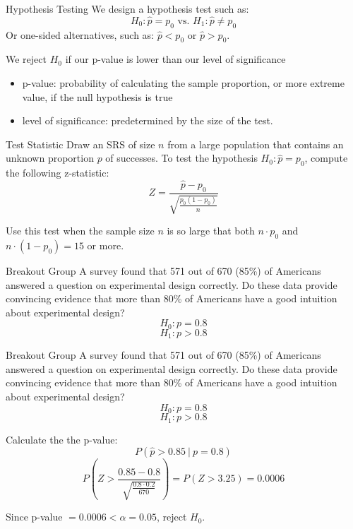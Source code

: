 \documentclass{beamer}
\begin{document}
\begin{frame}{Hypothesis Testing}
	We design a hypothesis test such as:
	\[ 
		H_0: \hat{p}=p_0 \text{ vs. } H_1: \hat{p} \neq p_0 
	\]
	Or one-sided alternatives, such as: $\hat{p} < p_0$ or $\hat{p} > p_0$.
	
	We reject $H_0$ if our p-value is lower than our level of significance
	\begin{itemize}
		\item p-value: probability of calculating the sample proportion, or more extreme value, if the null hypothesis is true
		\item level of significance: predetermined by the size of the test.
	\end{itemize}
\end{frame}


\begin{frame}{Test Statistic}
	Draw an SRS of size $n$ from a large population that contains an unknown proportion $p$ of successes. To test the hypothesis $H_0: \hat{p}=p_0$, compute the following z-statistic:
	\[ 
		Z=\frac{\hat{p}-p_0}{\sqrt{\frac{p_0(1-p_0)}{n}}}
	\]
	
	Use this test when the sample size $n$ is so large that both $n \cdot p_0$ and $n \cdot (1-p_0) = 15$ or more.
\end{frame}


\begin{frame}{Breakout Group}
	A survey found that 571 out of 670 (85\%) of Americans answered a question on experimental design correctly. Do these data provide convincing evidence that more than 80\% of Americans have a good intuition about experimental design?
	\[ 
		H_0: p=0.8 
	\]
	\[ 
		H_1: p>0.8 
	\]
\end{frame}

\frame

\begin{frame}{Breakout Group}
	A survey found that 571 out of 670 (85\%) of Americans answered a question on experimental design correctly. Do these data provide convincing evidence that more than 80\% of Americans have a good intuition about experimental design?
	\[ 
		H_0: p=0.8 
	\]
	\[ 
		H_1: p>0.8 
	\]

	Calculate the the p-value:
	\[ 
		P(\hat{p}>0.85 \ \vert \ p=0.8) 
	\]
	\[ 
		P(Z > \frac{0.85-0.8}{\sqrt{\frac{0.8 \cdot 0.2}{670}}}) = P(Z > 3.25) = 0.0006 
	\]

	Since  p-value $= 0.0006 < \alpha = 0.05$, reject $H_0$.
	

\end{frame}
\end{document}
